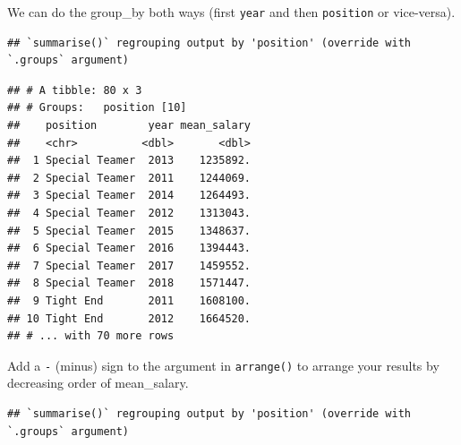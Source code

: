 \documentclass[
]{book}
\newenvironment{Shaded}{\begin{snugshade}}{\end{snugshade}}
\newcommand{\DataTypeTok}[1]{\textcolor[rgb]{0.13,0.29,0.53}{#1}}
\newcommand{\KeywordTok}[1]{\textcolor[rgb]{0.13,0.29,0.53}{\textbf{#1}}}
\newcommand{\NormalTok}[1]{#1}
\newcommand{\OperatorTok}[1]{\textcolor[rgb]{0.81,0.36,0.00}{\textbf{#1}}}
\newcommand{\StringTok}[1]{\textcolor[rgb]{0.31,0.60,0.02}{#1}}
\begin{document}
We can do the group\_by both ways (first \texttt{year} and then \texttt{position} or vice-versa).

\begin{Shaded}
\end{Shaded}

\begin{verbatim}
## `summarise()` regrouping output by 'position' (override with `.groups` argument)
\end{verbatim}

\begin{verbatim}
## # A tibble: 80 x 3
## # Groups:   position [10]
##    position        year mean_salary
##    <chr>          <dbl>       <dbl>
##  1 Special Teamer  2013    1235892.
##  2 Special Teamer  2011    1244069.
##  3 Special Teamer  2014    1264493.
##  4 Special Teamer  2012    1313043.
##  5 Special Teamer  2015    1348637.
##  6 Special Teamer  2016    1394443.
##  7 Special Teamer  2017    1459552.
##  8 Special Teamer  2018    1571447.
##  9 Tight End       2011    1608100.
## 10 Tight End       2012    1664520.
## # ... with 70 more rows
\end{verbatim}

Add a \texttt{-} (minus) sign to the argument in \texttt{arrange()} to arrange your results by decreasing order of mean\_salary.

\begin{Shaded}
\end{Shaded}

\begin{verbatim}
## `summarise()` regrouping output by 'position' (override with `.groups` argument)
\end{verbatim}
\end{document}
